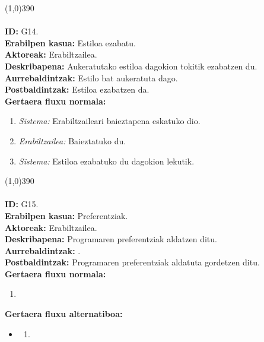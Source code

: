 \line(1,0){390}\\
\noindent\\
\textbf{ID:} G14.\\
\textbf{Erabilpen kasua:} Estiloa ezabatu.\\
\textbf{Aktoreak:} Erabiltzailea.\\
\textbf{Deskribapena:} Aukeratutako estiloa dagokion tokitik ezabatzen du.\\
\textbf{Aurrebaldintzak:} Estilo bat aukeratuta dago.\\
\textbf{Postbaldintzak:} Estiloa ezabatzen da.\\
\textbf{Gertaera fluxu normala:}
\begin{enumerate}
	\item \textit{Sistema:} Erabiltzaileari baieztapena eskatuko dio.
	\item \textit{Erabiltzailea:} Baieztatuko du.
	\item \textit{Sistema:} Estiloa ezabatuko du dagokion lekutik.
\end{enumerate}
\line(1,0){390}\\
\noindent\\
\textbf{ID:} G15.\\
\textbf{Erabilpen kasua:} Preferentziak.\\
\textbf{Aktoreak:} Erabiltzailea.\\
\textbf{Deskribapena:} Programaren preferentziak aldatzen ditu.\\
\textbf{Aurrebaldintzak:} .\\
\textbf{Postbaldintzak:} Programaren preferentziak aldatuta gordetzen ditu.\\
\textbf{Gertaera fluxu normala:}
\begin{enumerate}
	\item
\end{enumerate}
\textbf{Gertaera fluxu alternatiboa:}
\begin{itemize}
	\item 
		\begin{enumerate}
		\item
		\end{enumerate}
\end{itemize}
\newpage


